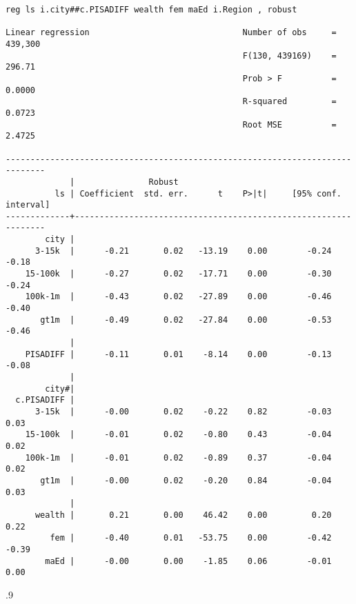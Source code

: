 \documentclass[10pt, letterpaper]{article}
\begin{document}
\begin{spacing}{1.4}
\begin{spacing}{.9}
\begin{scriptsize}
\begin{verbatim}
reg ls i.city##c.PISADIFF wealth fem maEd i.Region , robust

Linear regression                               Number of obs     =    439,300
                                                F(130, 439169)    =     296.71
                                                Prob > F          =     0.0000
                                                R-squared         =     0.0723
                                                Root MSE          =     2.4725

------------------------------------------------------------------------------
             |               Robust
          ls | Coefficient  std. err.      t    P>|t|     [95% conf. interval]
-------------+----------------------------------------------------------------
        city |
      3-15k  |      -0.21       0.02   -13.19    0.00        -0.24       -0.18
    15-100k  |      -0.27       0.02   -17.71    0.00        -0.30       -0.24
    100k-1m  |      -0.43       0.02   -27.89    0.00        -0.46       -0.40
       gt1m  |      -0.49       0.02   -27.84    0.00        -0.53       -0.46
             |
    PISADIFF |      -0.11       0.01    -8.14    0.00        -0.13       -0.08
             |
        city#|
  c.PISADIFF |
      3-15k  |      -0.00       0.02    -0.22    0.82        -0.03        0.03
    15-100k  |      -0.01       0.02    -0.80    0.43        -0.04        0.02
    100k-1m  |      -0.01       0.02    -0.89    0.37        -0.04        0.02
       gt1m  |      -0.00       0.02    -0.20    0.84        -0.04        0.03
             |
      wealth |       0.21       0.00    46.42    0.00         0.20        0.22
         fem |      -0.40       0.01   -53.75    0.00        -0.42       -0.39
        maEd |      -0.00       0.00    -1.85    0.06        -0.01        0.00

\end{verbatim}
\end{scriptsize}
\end{spacing}{.9}



\end{spacing}
\end{document}
